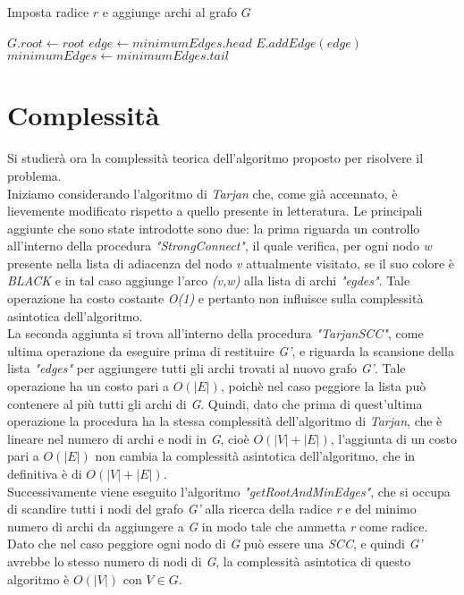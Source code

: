 \documentclass[10pt,a4paper,oneside,article,italian]{memoir}
\theoremstyle{definition}
\begin{document}
\begin{algorithm}
	\caption{Imposta radice $r$ e aggiunge archi al grafo $G$}
	\begin{algorithmic}[1]
		\State $G.root \gets root$
			\State $edge \gets minimumEdges.head$
			\State $E.addEdge(edge)$
			\State $minimumEdges \gets minimumEdges.tail$
		\EndWhile
	\EndProcedure
	\end{algorithmic}
\end{algorithm}
\newpage
\section{Complessità}\label{sec:complessita}
Si studierà ora la complessità teorica dell'algoritmo proposto per risolvere il problema.\\
Iniziamo considerando l'algoritmo di \textit{Tarjan} che, come già accennato, è lievemente modificato rispetto a quello presente in letteratura. Le principali aggiunte che sono state introdotte sono due: la prima riguarda un controllo all'interno della procedura \textit{"StrongConnect"}, il quale verifica, per ogni nodo \textit{w} presente nella lista di adiacenza del nodo \textit{v} attualmente visitato, se il suo colore è \textit{BLACK} e in tal caso aggiunge l'arco \textit{(v,w)} alla lista di archi \textit{"egdes"}. Tale operazione ha costo costante \textit{O(1)} e pertanto non influisce sulla complessità asintotica dell'algoritmo.\\
La seconda aggiunta si trova all'interno della procedura \textit{"TarjanSCC"}, come ultima operazione da eseguire prima di restituire \textit{G'}, e riguarda la scansione della lista \textit{"edges"} per aggiungere tutti gli archi trovati al nuovo grafo \textit{G'}. Tale operazione ha un costo pari a \textit{$O(|E|)$}, poichè nel caso peggiore la lista può contenere al più tutti gli archi di \textit{G}. Quindi, dato che prima di quest'ultima operazione la procedura ha la stessa complessità dell'algoritmo di \textit{Tarjan}, che è lineare nel numero di archi e nodi in \textit{G}, cioè \textit{$O(|V|+|E|)$}, l'aggiunta di un costo pari a \textit{$O(|E|)$} non cambia la complessità asintotica dell'algoritmo, che in definitiva è di \textit{$O(|V|+|E|)$}.\\
Successivamente viene eseguito l'algoritmo \textit{"getRootAndMinEdges"}, che si occupa di scandire tutti i nodi del grafo \textit{G'} alla ricerca della radice \textit{r} e del minimo numero di archi da aggiungere a \textit{G} in modo tale che ammetta \textit{r} come radice. Dato che nel caso peggiore ogni nodo di \textit{G} può essere una \textit{SCC}, e quindi \textit{G'} avrebbe lo stesso numero di nodi di \textit{G}, la complessità asintotica di questo algoritmo è \textit{$O(|V|)$} con \textit{$V \in G$}.\\
\end{document}
